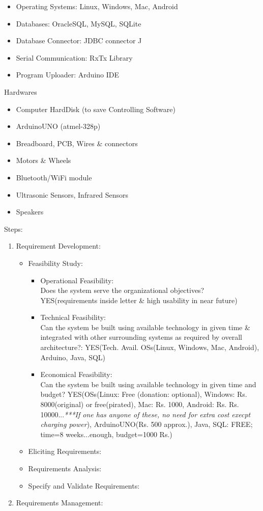 \documentclass{article}
\begin{document}
\begin{enumerate}
\begin{itemize}
				\item Operating Systems: Linux, Windows, Mac, Android
				\item Databases: OracleSQL, MySQL, SQLite
				\item Database Connector: JDBC connector J
				\item Serial Communication: RxTx Library
				\item Program Uploader: Arduino IDE
			\end{itemize}
			Hardwares
			\begin{itemize}
				\item Computer HardDisk (to save Controlling Software)
				\item ArduinoUNO (atmel-328p)
				\item Breadboard, PCB, Wires \& connectors
				\item Motors \& Wheels
				\item Bluetooth/WiFi module
				\item Ultrasonic Sensors, Infrared Sensors
				\item Speakers
			\end{itemize}
		\end{enumerate}
		Steps:
		\begin{enumerate}
			\item Requirement Development:		
			\begin{itemize}
				\item Feasibility Study:
				\begin{itemize}
					\item Operational Feasibility:
\\Does the system serve the organizational objectives?	YES(requirements inside letter \& high usability in near future)
					\item Technical Feasibility:
\\Can the system be built using available technology in given time \& integrated with other surrounding systems as required by overall architecture?:	YES(Tech. Avail. OSs(Linux, Windows, Mac, Android), Arduino, Java, SQL)
					\item Economical Feasibility:
\\Can the system be built using available technology in given time and budget?	YES(OSs(Linux: Free (donation: optional), Windows: Rs. 8000(original) or free(pirated), Mac: Rs. 1000, Android: Rs. Rs. 10000...\emph{***If one has anyone of these, no need for extra cost execpt charging power}), ArduinoUNO(Rs. 500 approx.), Java, SQL: FREE; time=8 weeks...enough, budget=1000 Rs.)
				\end{itemize}
				\item Eliciting Requirements:
				\item Requirements Analysis:
				\item Specify and Validate Requirements:
			\end{itemize}
			\item Requirements Management:
		\end{enumerate}
\end{document}

